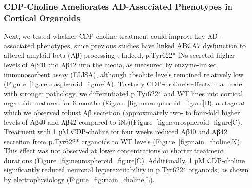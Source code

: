 \subsubsection{CDP-Choline Ameliorates AD-Associated Phenotypes in Cortical Organoids}
Next, we tested whether CDP-choline treatment could improve key AD-associated phenotypes, since previous studies have linked ABCA7 dysfunction to altered amyloid-beta (Aβ) processing \cite{Satoh2015-yu,Sakae2016-uy,Bamji-Mirza2018-xt,Chan2008-qu,De_Roeck2018-fw}. Indeed, p.Tyr622* iNs secreted higher levels of Aβ40 and Aβ42 into the media, as measured by enzyme-linked immunosorbent assay (ELISA), although absolute levels remained relatively low (Figure~\ref{fig:neurospheroid_figure}A). To study CDP-choline's effects in a model with stronger pathology, we differentiated p.Tyr622* and WT lines into cortical organoids matured for 6 months (Figure~\ref{fig:neurospheroid_figure}B), a stage at which we observed robust Aβ secretion (approximately two- to four-fold higher levels of Aβ40 and Aβ42 compared to iNs)(Figure~\ref{fig:neurospheroid_figure}C). Treatment with 1 µM CDP-choline for four weeks reduced Aβ40 and Aβ42 secretion from p.Tyr622* organoids to WT levels (Figure~\ref{fig:main_choline}K). This effect was not observed at lower concentrations or shorter treatment durations (Figure~\ref{fig:neurospheroid_figure}C). Additionally, 1 µM CDP-choline significantly reduced neuronal hyperexcitability in p.Tyr622* organoids, as shown by electrophysiology (Figure~\ref{fig:main_choline}L).

